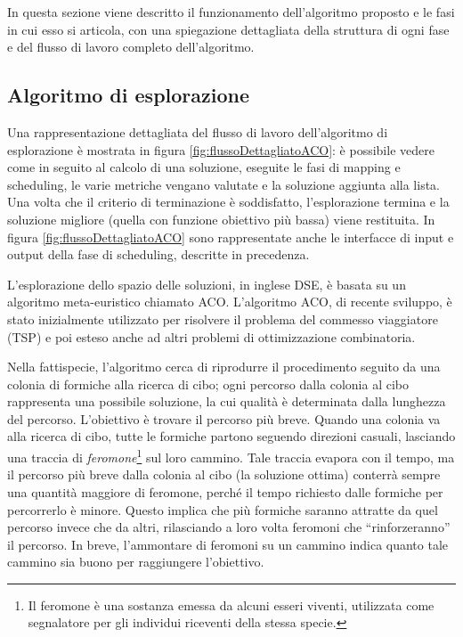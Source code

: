 In questa sezione viene descritto il funzionamento dell'algoritmo proposto e le 
fasi in cui esso si articola, con una spiegazione dettagliata della struttura 
di ogni fase e del flusso di lavoro completo dell'algoritmo.


\subsection{Algoritmo di esplorazione}
Una rappresentazione dettagliata del flusso di lavoro dell'algoritmo di
esplorazione \`e mostrata in figura \ref{fig:flussoDettagliatoACO}: \`e
possibile vedere come in seguito al calcolo di una soluzione, eseguite le fasi
di mapping e scheduling, le varie metriche vengano valutate e la soluzione
aggiunta alla lista. Una volta che il criterio di terminazione \`e soddisfatto,
l'esplorazione termina e la soluzione migliore (quella con funzione obiettivo pi\`u
bassa) viene restituita. In figura \ref{fig:flussoDettagliatoACO} sono rappresentate
anche le interfacce di input e output della fase di scheduling, descritte in precedenza.

L'esplorazione dello spazio delle soluzioni, in inglese \ac{DSE},  \`e basata su un algoritmo
meta-euristico chiamato \acf{ACO}. L'algoritmo \ac{ACO}, di recente sviluppo, è stato inizialmente 
utilizzato per risolvere il problema del commesso viaggiatore (\acs{TSP}) 
\cite{AntSystem} e poi esteso anche ad altri problemi di ottimizzazione 
combinatoria.

Nella fattispecie, l'algoritmo cerca di riprodurre il procedimento seguito da una colonia di 
formiche alla ricerca di cibo; ogni percorso dalla colonia al cibo rappresenta una possibile soluzione,
la cui qualit\`a \`e determinata dalla lunghezza del percorso. L'obiettivo
\`e trovare il percorso pi\`u breve.
Quando una colonia va alla ricerca di cibo, tutte le formiche partono
seguendo direzioni casuali, lasciando una traccia di 
\emph{feromone}\footnote{Il feromone è una sostanza emessa da alcuni esseri 
viventi, utilizzata come segnalatore per gli individui riceventi 
della stessa specie.} sul loro cammino. Tale traccia evapora con il tempo,
ma il percorso più breve dalla colonia al cibo (la soluzione ottima) conterrà 
sempre una quantit\`a maggiore di feromone, perch\'e il tempo richiesto dalle formiche
per percorrerlo \`e minore. Questo implica che pi\`u formiche saranno attratte da
quel percorso invece che da altri, rilasciando a loro volta feromoni che
``rinforzeranno'' il percorso. In breve, l'ammontare di feromoni su un cammino
indica quanto tale cammino sia buono per raggiungere l'obiettivo.

